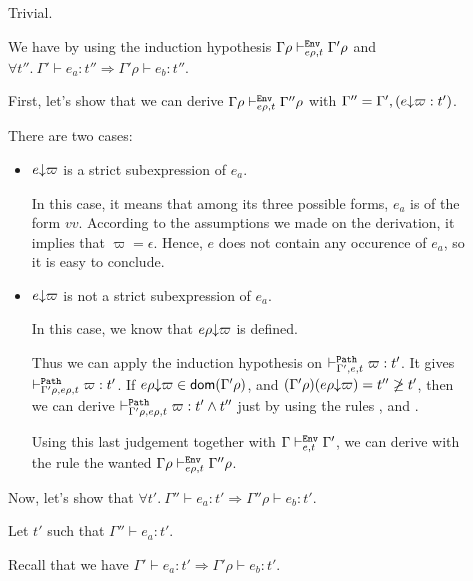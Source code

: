 \documentclass[a4paper]{article}
\theoremstyle{definition}
\begin{document}
\begin{description}
          \item[] Trivial.
          \item[] We have by using the induction hypothesis $\Gamma\rho \vdash^{\texttt{Env}}_{e\rho,t} \Gamma'\rho$
          and $\forall t''.\ \Gamma' \vdash e_a : t'' \Rightarrow \Gamma'\rho \vdash e_b:t''$.
          
          First, let's show that we can derive $\Gamma\rho \vdash^{\texttt{Env}}_{e\rho,t} {\Gamma''}\rho$ with $\Gamma''=\Gamma',(e{\downarrow}\varpi:t')$.
          
          There are two cases:
          \begin{itemize}
            \item $e{\downarrow}\varpi$ is a strict subexpression of $e_a$.
            
            In this case, it means that among its three possible forms,
            $e_a$ is of the form $v v$.
            According to the assumptions we made on the derivation, it implies that $\varpi=\epsilon$.
            Hence, $e$ does not contain any occurence of $e_a$, so it is easy to conclude.

            \item $e{\downarrow}\varpi$ is not a strict subexpression of $e_a$.
            
            In this case, we know that $e\rho{\downarrow}\varpi$ is defined.

            Thus we can apply the induction hypothesis on $\vdash^{\texttt{Path}}_{\Gamma',e,t} \varpi:t'$.
            It gives $\vdash^{\texttt{Path}}_{\Gamma'\rho,e\rho,t} \varpi:t'$.
            If $e\rho{\downarrow}\varpi \in\textsf{dom}(\Gamma'\rho)$, and $(\Gamma'\rho)(e\rho{\downarrow}\varpi)=t''\not\geq t'$,
            then we can derive $\vdash^{\texttt{Path}}_{\Gamma'\rho,e\rho,t} \varpi:t'\land t''$ just by using the rules
            ,  and .

            Using this last judgement together with $\Gamma \vdash^{\texttt{Env}}_{e,t} \Gamma'$, we can derive with the rule 
            the wanted $\Gamma\rho \vdash^{\texttt{Env}}_{e\rho,t} {\Gamma''}\rho$.
          \end{itemize}

          Now, let's show that $\forall t'.\ \Gamma'' \vdash e_a : t' \Rightarrow \Gamma''\rho \vdash e_b:t'$.

          Let $t'$ such that $\Gamma''\vdash e_a:t'$.

          Recall that we have $\Gamma' \vdash e_a : t' \Rightarrow \Gamma'\rho \vdash e_b:t'$.


\end{description}
\end{document}
